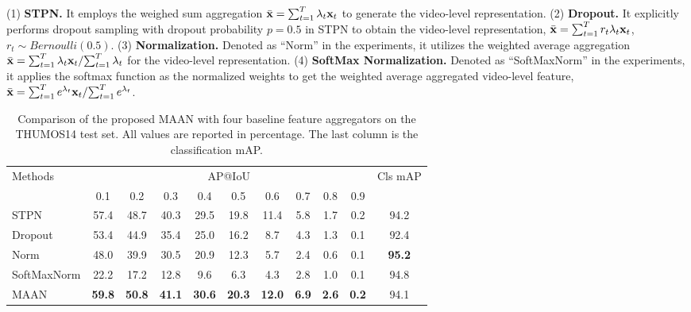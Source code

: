 \documentclass{article} \usepackage{iclr2019_conference,times}
\begin{document}
(1) \textbf{STPN.} It employs the weighed sum aggregation $ {\bar {\bf x} = \sum\nolimits_{t = 1}^T {{\lambda _t}{{\bf x}_t}} } $ to generate the video-level representation. (2) \textbf{Dropout.} It explicitly performs dropout sampling with dropout probability $p=0.5$ in STPN to obtain the video-level representation, $ {\bar {\bf x} = \sum\nolimits_{t = 1}^T {r_t{\lambda _t}{{\bf x}_t}} } $, $ r_t \sim Bernoulli(0.5)$. (3) \textbf{Normalization.} Denoted as ``Norm'' in the experiments, it utilizes the weighted average aggregation   $\bar {\bf x} = {\sum\nolimits_{t = 1}^T {{\lambda _t}{{\bf x}_t}} }/{{\sum\nolimits_{t = 1}^T {{\lambda _t}} }}$ for the video-level representation. (4) \textbf{SoftMax Normalization.} Denoted as ``SoftMaxNorm'' in the experiments, it applies the softmax function as the normalized weights to get the weighted average aggregated video-level feature,   $\bar {\bf x} = {\sum\nolimits_{t = 1}^T {e^{\lambda _t}{{\bf x}_t}} } /{{\sum\nolimits_{t = 1}^T {e^{\lambda _t}} }}$. 

\begin{table}[t]
\vspace{-4mm}
\label{tab:model_compare}
\centering
\begin{footnotesize}
\vspace{-3mm}
\caption{Comparison of the proposed MAAN with four baseline feature aggregators on the THUMOS14 test set. All values are reported in percentage. The last column is the classification mAP.}
\label{tab:model_compare}
\begin{tabular}{lcccccccccc}
\toprule
 \multirow{2}{*}{Methods} & \multicolumn{9}{c}{AP@IoU}   &    \multirow{2}{*}{Cls mAP} \\ 
                                                           & 0.1 & 0.2 & 0.3 & 0.4 & 0.5 & 0.6 & 0.7 & 0.8 & 0.9 & \\ \midrule

STPN & 57.4  &  48.7 & 40.3  &  29.5 &  19.8 &  11.4  & 5.8  &  1.7   &  0.2 & 94.2 \\ 
Dropout & 53.4 &  44.9 & 35.4  & 25.0 &  16.2 &  8.7   & 4.3  & 1.3   & 0.1  & 92.4 \\ 
Norm & 48.0 & 39.9 & 30.5 & 20.9 & 12.3  & 5.7 &  2.4  &  0.6  &  0.1 & \textbf{95.2} \\  
SoftMaxNorm & 22.2 & 17.2 & 12.8 & 9.6 & 6.3  &  4.3  &  2.8 &  1.0  &  0.1 & 94.8 \\  
 MAAN & \textbf{59.8} & \textbf{50.8} & \textbf{41.1} & \textbf{30.6} & \textbf{20.3}  & \textbf{12.0}    & \textbf{6.9} & \textbf{2.6} & \textbf{0.2}  & 94.1 \\ \bottomrule
\end{tabular}
\end{footnotesize}
\end{table}
\end{document}
